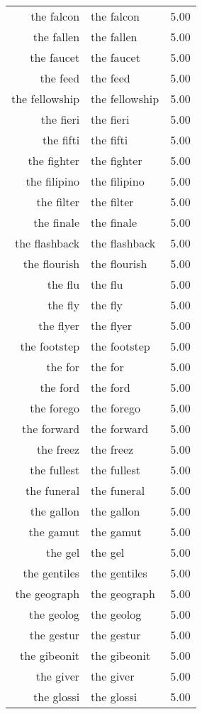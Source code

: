 \begin{table}[ht]
\begin{tabular}{rlr}
  the falcon & the falcon & 5.00 \\ 
  the fallen & the fallen & 5.00 \\ 
  the faucet & the faucet & 5.00 \\ 
  the feed & the feed & 5.00 \\ 
  the fellowship & the fellowship & 5.00 \\ 
  the fieri & the fieri & 5.00 \\ 
  the fifti & the fifti & 5.00 \\ 
  the fighter & the fighter & 5.00 \\ 
  the filipino & the filipino & 5.00 \\ 
  the filter & the filter & 5.00 \\ 
  the finale & the finale & 5.00 \\ 
  the flashback & the flashback & 5.00 \\ 
  the flourish & the flourish & 5.00 \\ 
  the flu & the flu & 5.00 \\ 
  the fly & the fly & 5.00 \\ 
  the flyer & the flyer & 5.00 \\ 
  the footstep & the footstep & 5.00 \\ 
  the for & the for & 5.00 \\ 
  the ford & the ford & 5.00 \\ 
  the forego & the forego & 5.00 \\ 
  the forward & the forward & 5.00 \\ 
  the freez & the freez & 5.00 \\ 
  the fullest & the fullest & 5.00 \\ 
  the funeral & the funeral & 5.00 \\ 
  the gallon & the gallon & 5.00 \\ 
  the gamut & the gamut & 5.00 \\ 
  the gel & the gel & 5.00 \\ 
  the gentiles & the gentiles & 5.00 \\ 
  the geograph & the geograph & 5.00 \\ 
  the geolog & the geolog & 5.00 \\ 
  the gestur & the gestur & 5.00 \\ 
  the gibeonit & the gibeonit & 5.00 \\ 
  the giver & the giver & 5.00 \\ 
  the glossi & the glossi & 5.00 \\ 

\end{tabular}
\end{table}
